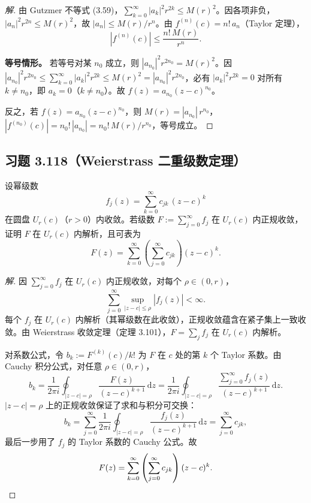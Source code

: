 \documentclass[11pt,a4paper]{article}
\newcommand{\dd}{\mathrm{d}}
\theoremstyle{definition}
\newenvironment{solution}{\begin{proof}[解]}{\end{proof}}
\begin{document}
\begin{solution}
  由 Gutzmer 不等式 (3.59)，$\sum_{k=0}^{\infty}|a_k|^2 r^{2k} \le M(r)^2$。因各项非负，$|a_n|^2 r^{2n} \le M(r)^2$，故 $|a_n| \le M(r)/r^n$。由 $f^{(n)}(c) = n!\,a_n$（Taylor 定理），
  \[
    |f^{(n)}(c)| \le \frac{n!\,M(r)}{r^n}.
  \]

  \textbf{等号情形。}\;
  若等号对某 $n_0$ 成立，则 $|a_{n_0}|^2 r^{2n_0} = M(r)^2$。因 $|a_{n_0}|^2 r^{2n_0} \le \sum_{k=0}^{\infty}|a_k|^2 r^{2k} \le M(r)^2 = |a_{n_0}|^2 r^{2n_0}$，必有 $|a_k|^2 r^{2k} = 0$ 对所有 $k \ne n_0$，即 $a_k = 0$（$k \ne n_0$）。故 $f(z) = a_{n_0}(z-c)^{n_0}$。

  反之，若 $f(z) = a_{n_0}(z-c)^{n_0}$，则 $M(r) = |a_{n_0}|\,r^{n_0}$，$|f^{(n_0)}(c)| = n_0!\,|a_{n_0}| = n_0!\,M(r)/r^{n_0}$，等号成立。\qedhere
\end{solution}

\subsection{习题 3.118（Weierstrass 二重级数定理）}

设幂级数
\[
  f_j(z) = \sum_{k=0}^{\infty} c_{jk}\,(z-c)^k
\]
在圆盘 $U_r(c)$（$r > 0$）内收敛。若级数 $F := \sum_{j=0}^{\infty} f_j$ 在 $U_r(c)$ 内正规收敛，证明 $F$ 在 $U_r(c)$ 内解析，且可表为
\[
  F(z) = \sum_{k=0}^{\infty}
  \left(\sum_{j=0}^{\infty} c_{jk}\right)(z-c)^k.
\]

\begin{solution}
  因 $\sum_{j=0}^{\infty} f_j$ 在 $U_r(c)$ 内正规收敛，对每个 $\rho \in (0,r)$，
  \[
    \sum_{j=0}^{\infty} \sup_{|z-c|\le\rho}|f_j(z)| < \infty.
  \]
  每个 $f_j$ 在 $U_r(c)$ 内解析（其幂级数在此收敛），正规收敛蕴含在紧子集上一致收敛。由 Weierstrass 收敛定理（定理 3.101），$F = \sum_j f_j$ 在 $U_r(c)$ 内解析。

  对系数公式，令 $b_k := F^{(k)}(c)/k!$ 为 $F$ 在 $c$ 处的第 $k$ 个 Taylor 系数。由 Cauchy 积分公式，对任意 $\rho \in (0,r)$，
  \[
    b_k = \frac{1}{2\pi i}\oint_{|z-c|=\rho}
    \frac{F(z)}{(z-c)^{k+1}}\,\dd z
    = \frac{1}{2\pi i}\oint_{|z-c|=\rho}
    \frac{\sum_{j=0}^{\infty} f_j(z)}{(z-c)^{k+1}}\,\dd z.
  \]
  $|z-c| = \rho$ 上的正规收敛保证了求和与积分可交换：
  \[
    b_k = \sum_{j=0}^{\infty}
    \frac{1}{2\pi i}\oint_{|z-c|=\rho}
    \frac{f_j(z)}{(z-c)^{k+1}}\,\dd z
    = \sum_{j=0}^{\infty} c_{jk},
  \]
  最后一步用了 $f_j$ 的 Taylor 系数的 Cauchy 公式。故
  \[
    F(z) = \sum_{k=0}^{\infty}
    \left(\sum_{j=0}^{\infty} c_{jk}\right)(z-c)^k.\qedhere
  \]
\end{solution}
\end{document}
